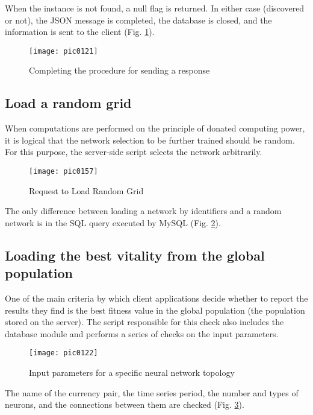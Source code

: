 When the instance is not found, a null flag is returned. In either case (discovered or not), the JSON message is completed, the database is closed, and the information is sent to the client (Fig. \ref{fig:pic0121}).

\begin{figure}[h]
\centering
\texttt{[image: pic0121]}
\caption{Completing the procedure for sending a response}
\label{fig:pic0121}
\end{figure}
\FloatBarrier

\subsection{Load a random grid}

When computations are performed on the principle of donated computing power, it is logical that the network selection to be further trained should be random. For this purpose, the server-side script selects the network arbitrarily.

\begin{figure}[h]
\centering
\texttt{[image: pic0157]}
\caption{Request to Load Random Grid}
\label{fig:pic0157}
\end{figure}
\FloatBarrier

The only difference between loading a network by identifiers and a random network is in the SQL query executed by MySQL (Fig. \ref{fig:pic0157}).

\subsection{Loading the best vitality from the global population}

One of the main criteria by which client applications decide whether to report the results they find is the best fitness value in the global population (the population stored on the server). The script responsible for this check also includes the database module and performs a series of checks on the input parameters.

\begin{figure}[h]
\centering
\texttt{[image: pic0122]}
\caption{Input parameters for a specific neural network topology}
\label{fig:pic0122}
\end{figure}
\FloatBarrier

The name of the currency pair, the time series period, the number and types of neurons, and the connections between them are checked (Fig. \ref{fig:pic0122}).

